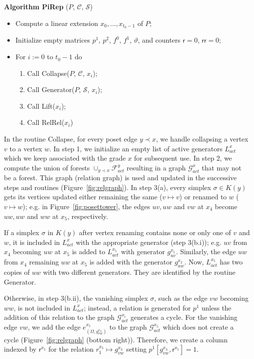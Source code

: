 \documentclass[english,a4paper,nolineno,cleveref]{socg-lipics-v2021}
\newcommand{\G}{\mathcal G}
\newcommand{\F}{\mathcal F}
\def\rsf{\mathsf{r}}
\def\rrsf{\mathsf{rr}}
\begin{document}
\noindent
{\bf Algorithm {\sc PiRep}} ($P$, $\mathcal C$, $\mathcal S$)
\begin{itemize}
    \item Compute a linear extension $x_0,\ldots,x_{t_0\minus 1}$ of $P$;
    \item Initialize empty matrices $p^1$, $p^2$, $f^0$, $f^1$, $\vartheta$, and counters $\rsf=0$, $\rrsf=0$;
    \item For $i:=0$ to $t_0-1$ do 
    \begin{enumerate}
        \item Call {\sc Collapse}($P$, $\mathcal C$, $x_i$);
        \item Call {\sc Generator}($P$, $\mathcal S$, $x_i$);
        \item Call {\sc Lift}($x_i$);
        \item Call {\sc RelRel}($x_i$)
    \end{enumerate}
\end{itemize}

In the routine {\sc Collapse}, for every poset edge $y\prec x$, we handle collapsing a vertex $v$ to a vertex $w$. In step 1, we initialize an empty list of active generators $L_{act}^x$ which we keep associated with the grade $x$ for subsequent use. In step 2, we compute the union of forests
$\cup_{y\prec x}\F_{act}^{y}$ resulting in a graph $\G_{act}^{x}$
that may not be a forest. This graph (relation graph) is used and updated 
in the successive steps and routines (Figure~\ref{fig:relgraph}). In step 3(a), every simplex $\sigma\in K(y)$ 
gets its vertices updated either remaining the same ($v\mapsto v$)
or renamed to $w$ ($v\mapsto w$); e.g. in Figure~\ref{fig:posettower}, the edges
$uv, uw$ and $vw$ at $x_4$ become $uw, uw$ and $ww$ at $x_5$, respectively.

If a simplex $\sigma$ in $K(y)$ after vertex renaming contains none or
only one of $v$ and $w$, it is included in $L_{act}^{x}$ with the appropriate generator (step 3(b.i));
e.g. $uv$ from $x_4$ becoming $uw$ at $x_5$ is added to $L_{act}^{x_5}$ with generator $g_{uv}^{x_1}$. Similarly, the edge $uw$ from $x_4$ remaining $uw$ at $x_5$ is added
with the generator $g_{uw}^{x_2}$. Now, $L_{act}^{x_5}$ has two copies of
$uw$ with two different generators. They are identified by the routine {\sc Generator}.

Otherwise, in step 3(b.ii), the vanishing simplex $\sigma$, such as the edge $vw$ becoming $ww$, is not included in $L_{act}^{x}$; instead, a relation is generated for $p^1$ unless the addition of this relation to the graph $\G_{act}^{x_i}$ generates a cycle. For the vanishing edge $vw$, we add the edge $e^{x_5}_{(\Omega,g_{vw}^{x_3})}$ to the graph $\G^{x_5}_{act}$
which does not create a cycle (Figure~\ref{fig:relgraph} (bottom right)). Therefore, we create
a column indexed by $\rsf^{x_5}$ for the relation $r_1^{x_5}\mapsto g_{vw}^{x_3}$ setting
$p^1[g_{vw}^{x_3},\rsf^{x_5}]=1$.
\end{document}
